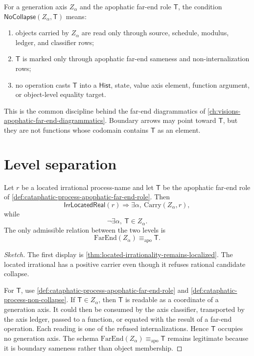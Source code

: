\begin{definition}
\label{def:cataphatic-process-non-collapse}
For a generation axis $Z_\alpha$ and the apophatic far-end role
$\mathsf{T}$, the condition
$\mathsf{NoCollapse}(Z_\alpha,\mathsf{T})$ means:
\begin{enumerate}
\item objects carried by $Z_\alpha$ are read only through source, schedule,
modulus, ledger, and classifier rows;
\item $\mathsf{T}$ is marked only through apophatic far-end sameness and
non-internalization rows;
\item no operation casts $\mathsf{T}$ into a $\mathsf{Hist}$, state, value
axis element, function argument, or object-level equality target.
\end{enumerate}
\end{definition}

This is the common discipline behind the far-end diagrammatics of
\autoref{ch:visions-apophatic-far-end-diagrammatics}. Boundary arrows may
point toward $\mathsf{T}$, but they are not functions whose codomain contains
$\mathsf{T}$ as an element.

\section{Level separation}
\label{sec:cataphatic-process-level-separation}

\begin{theorem}
\label{thm:cataphatic-process-apophatic-far-end-level-separation}
Let $r$ be a located irrational process-name and let $\mathsf{T}$ be the
apophatic far-end role of \autoref{def:cataphatic-process-apophatic-far-end-role}.
Then
$$
\mathsf{IrrLocatedReal}(r)
\Longrightarrow
\exists \alpha,\ \mathrm{Carry}(Z_\alpha,r),
$$
while
$$
\neg\exists \alpha,\ \mathsf{T}\in Z_\alpha.
$$
The only admissible relation between the two levels is
$$
\mathrm{FarEnd}(Z_\alpha)\equiv_{\mathrm{apo}}\mathsf{T}.
$$
\end{theorem}

\begin{proof}[Sketch]
The first display is \autoref{thm:located-irrationality-remains-localized}.
The located irrational has a positive carrier even though it refuses rational
candidate collapse.

For $\mathsf{T}$, use \autoref{def:cataphatic-process-apophatic-far-end-role}
and \autoref{def:cataphatic-process-non-collapse}. If
$\mathsf{T}\in Z_\alpha$, then $\mathsf{T}$ is readable as a coordinate of a
generation axis. It could then be consumed by the axis classifier, transported
by the axis ledger, passed to a function, or equated with the result of a
far-end operation. Each reading is one of the refused internalizations. Hence
$\mathsf{T}$ occupies no generation axis. The schema
$\mathrm{FarEnd}(Z_\alpha)\equiv_{\mathrm{apo}}\mathsf{T}$ remains legitimate
because it is boundary sameness rather than object membership.
\end{proof}

